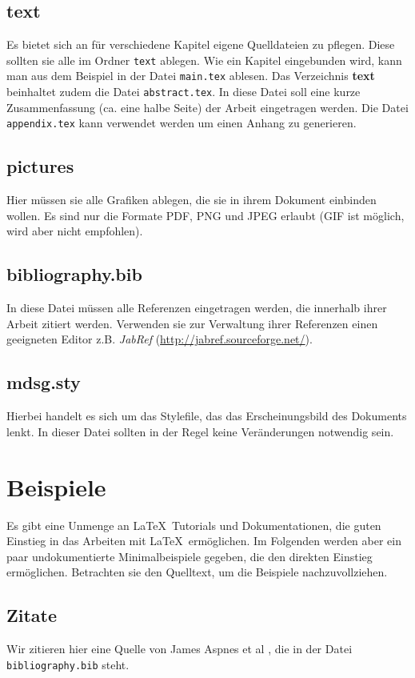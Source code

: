 \subsection{\textbf{text}}
Es bietet sich an für verschiedene Kapitel eigene Quelldateien zu pflegen. Diese sollten sie alle im
Ordner \verb|text| ablegen. Wie ein Kapitel eingebunden wird, kann man aus dem Beispiel in der
Datei \verb|main.tex| ablesen. Das Verzeichnis \textbf{text} beinhaltet zudem die Datei
\verb|abstract.tex|. In diese Datei soll eine kurze Zusammenfassung (ca. eine halbe Seite)
der Arbeit eingetragen werden. Die Datei \verb|appendix.tex| kann verwendet werden um einen
Anhang zu generieren.
\subsection{\textbf{pictures}}
Hier müssen sie alle Grafiken ablegen, die sie in ihrem Dokument einbinden wollen. Es sind nur die
Formate PDF, PNG und JPEG erlaubt (GIF ist möglich, wird aber nicht empfohlen).
\subsection{\textbf{bibliography.bib}}
In diese Datei müssen alle Referenzen eingetragen werden,
die innerhalb ihrer Arbeit zitiert werden. Verwenden sie zur Verwaltung ihrer Referenzen einen
geeigneten Editor z.B. \textit{JabRef} (\url{http://jabref.sourceforge.net/}).
\subsection{\textbf{mdsg.sty}}
Hierbei handelt es sich um das Stylefile, das das Erscheinungsbild des Dokuments
lenkt. In dieser Datei sollten in der Regel keine Veränderungen notwendig sein.
\section{Beispiele}
Es gibt eine Unmenge an \LaTeX\ Tutorials und Dokumentationen, die guten Einstieg in das Arbeiten mit
\LaTeX\ ermöglichen. Im Folgenden werden aber ein paar undokumentierte Minimalbeispiele gegeben, die
den direkten Einstieg ermöglichen. Betrachten sie den Quelltext, um die Beispiele nachzuvollziehen.
\subsection{Zitate}
Wir zitieren hier eine Quelle von James Aspnes et al \cite{aspn07}, die in der  Datei\\
\verb|bibliography.bib|
steht.
